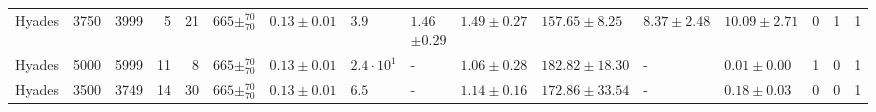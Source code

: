 \begin{tabular}{lrrrrllllllllrrr}
   Hyades &                           3750 &                           3999 &      5 &                   21 &     $665\pm _{70}^{70}$ &   $0.13\pm0.01$ &                      $3.9$ &     $1.46$$\pm0.29$ &        $1.49\pm0.27$ &               $157.65\pm8.25$ &                          $8.37\pm2.48$ &                          $10.09\pm2.71$ &       0 &                1 &                 1 \\
   Hyades &                           5000 &                           5999 &     11 &                    8 &     $665\pm _{70}^{70}$ &   $0.13\pm0.01$ &        $2.4 \cdot 10^{1}$ &                   - &        $1.06\pm0.28$ &              $182.82\pm18.30$ &                                      - &                           $0.01\pm0.00$ &       1 &                0 &                 1 \\
   Hyades &                           3500 &                           3749 &     14 &                   30 &     $665\pm _{70}^{70}$ &   $0.13\pm0.01$ &                      $6.5$ &                   - &        $1.14\pm0.16$ &              $172.86\pm33.54$ &                                      - &                           $0.18\pm0.03$ &       0 &                0 &                 1 \\
\bottomrule
\end{tabular}
